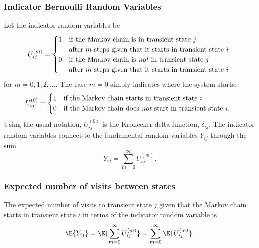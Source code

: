 \documentclass[12pt]{article}
\begin{document}
\subsubsection*{Indicator Bernoulli Random Variables}

Let the indicator random variables be
\[
    U_{ij}^{(m)} =
    \begin{cases}
        1 & \text{if the Markov chain is in transient state \( j \)} \\
        & \text{after \( m \) steps given that it starts in transient
        state \( i \) } \\
        0 & \text{if the Markov chain is \emph{not} in transient state \(
        j \) } \\
        & \text{after \( m \) steps given that it starts in transient
        state \( i \)}
    \end{cases}
\] for \( m = 0, 1,2, \dots \).  The case \( m = 0 \) simply indicates
where the system starts:
\[
    U_{ij}^{(0)} =
    \begin{cases}
        1 & \text{if the Markov chain starts in transient state \( i \)
        } \\
        0 & \text{if the Markov chain does \emph{not} start in transient
        state \( i \).  }
    \end{cases}
\] Using the usual notation, \( U_{ij}^{(0)} \) is the Kronecker delta
function, \( \delta_{ij} \).  The indicator random variables connect to
the fundamental random variables \( Y_{ij} \) through the sum
\[
    Y_{ij} = \sum\limits_{m=0}^{\infty} U_{ij}^{(m)}.
\]

\subsubsection*{Expected number of visits between states}

The expected number of visits to transient state \( j \) given that the
Markov chain starts in transient state \( i \) in terms of the indicator
random variable is
\[
    \E{Y_{ij}} = \E{\sum\limits_{m=0}^{\infty} U_{ij}^{(m)} } = \sum\limits_
    {m=0}^{\infty} \E{U_{ij}^{(m)}}.
\]
\end{document}
